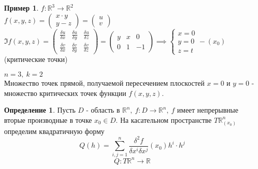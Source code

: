 \documentclass{report}
\theoremstyle{definition}
\newtheorem{definition}{Определение}[section]
\newtheorem{example}{Пример}
\begin{document}
\begin{example}
  $f:\mathbb{R}^3 \rightarrow\mathbb{R}^2$ \\

  $f(x,y,z) = \left(\begin{array}{c}
        x\cdot y \\
        y - z
      \end{array}\right) = \left(\begin{array}{c}
        u \\
        v
      \end{array}\right)$ \\

  $\mathfrak{I} f(x,y,z) = \left( \begin{array}{ccc}
        \frac{\delta u}{\delta x} & \frac{\delta u}{\delta y} & \frac{\delta u}{\delta z} \\
        \frac{\delta v}{\delta x} & \frac{\delta v}{\delta y} & \frac{\delta v}{\delta z}
      \end{array} \right) = \left( \begin{array}{ccc}
        y & x & 0  \\
        0 & 1 & -1
      \end{array} \right) \implies \left\{ \begin{array}{l}
      x = 0 \\
      y = 0 \\
      z = t
    \end{array}\right. - (x_0)$ (критические точки)

  $n = 3, \ k = 2$ \\

  Множество точек прямой, получаемой пересечением плоскостей $x = 0$ и $y = 0$ - множество критических точек функции $f(x,y,z)$.
\end{example}

\begin{definition}
  Пусть $D$ - область в $\mathbb{R}^n, \ f:D\rightarrow\mathbb{R}^n, \ f$ имеет непрерывные вторые производные в точке $x_0 \in D$. На касательном пространстве $T\mathbb{R}^n_{(x_0)}$ определим квадратичную форму
  \begin{equation*}
    Q(h) = \sum_{i,j = 1}^{n}\frac{\delta^2 f}{\delta x^i \delta x^j}(x_0)h^i\cdot h^j
  \end{equation*}
  \begin{equation*}
    Q:T\mathbb{R}^n \rightarrow \mathbb{R}
  \end{equation*}
\end{definition}
\end{document}
